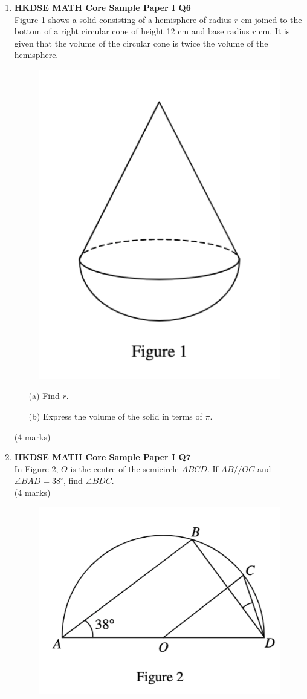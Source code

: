 \documentclass[12pt]{article}
\begin{document}
\begin{enumerate}
	\item \textbf{HKDSE MATH Core Sample Paper I Q6}\\
	Figure 1 shows a solid consisting of a hemisphere of radius $r$ cm joined to the bottom of a right circular cone of height 12 cm and base radius $r$ cm. It is given that the volume of the circular cone is twice the volume of the hemisphere.
	\begin{figure}[H]
		\centering
		\includegraphics[width = .5\linewidth]{SPFigure1.1}
	\end{figure}
	\begin{enumerate}
		\item[(a)] Find $r$.
		\item[(b)] Express the volume of the solid in terms of $\pi$.
	\end{enumerate}
	(4 marks)

	\item \textbf{HKDSE MATH Core Sample Paper I Q7}\\
	In Figure 2, $O$ is the centre of the semicircle $ABCD$. If $AB//OC$ and $\angle BAD = 38^\circ$, find $\angle BDC$. \\(4 marks)
	\begin{figure}[H]
		\centering
		\includegraphics[width = .5\linewidth]{SPFigure1.2}
	\end{figure}


\end{enumerate}
\end{document}
